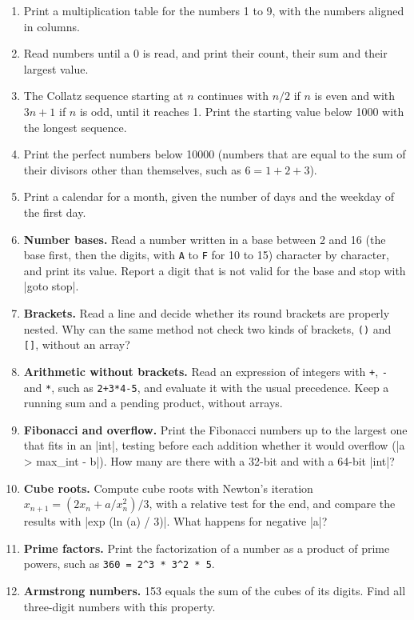 \begin{enumerate}
\item Print a multiplication table for the numbers 1 to 9, with the
  numbers aligned in columns.
\item Read numbers until a 0 is read, and print their count, their sum and
  their largest value.
\item The Collatz sequence starting at $n$ continues with $n/2$ if $n$ is
  even and with $3n+1$ if $n$ is odd, until it reaches 1. Print the
  starting value below 1000 with the longest sequence.
\item Print the perfect numbers below 10000 (numbers that are equal to
  the sum of their divisors other than themselves, such as
  $6 = 1 + 2 + 3$).
\item Print a calendar for a month, given the number of days and the
  weekday of the first day.
\item \textbf{Number bases.} Read a number written in a base between 2
  and 16 (the base first, then the digits, with \texttt{A} to
  \texttt{F} for 10 to 15) character by character, and print its value.
  Report a digit that is not valid for the base and stop with
  \code|goto stop|.
\item \textbf{Brackets.} Read a line and decide whether its round
  brackets are properly nested. Why can the same method not check two
  kinds of brackets, \texttt{()} and \texttt{[]}, without an array?
\item \textbf{Arithmetic without brackets.} Read an expression of
  integers with \texttt{+}, \texttt{-} and \texttt{*}, such as
  \texttt{2+3*4-5}, and evaluate it with the usual precedence. Keep a
  running sum and a pending product, without arrays.
\item \textbf{Fibonacci and overflow.} Print the Fibonacci numbers up
  to the largest one that fits in an \code|int|, testing before each
  addition whether it would overflow (\code|a > max_int - b|). How many
  are there with a 32-bit and with a 64-bit \code|int|?
\item \textbf{Cube roots.} Compute cube roots with Newton's iteration
  $x_{n+1} = (2 x_n + a / x_n^2) / 3$, with a relative test for the end,
  and compare the results with \code|exp (ln (a) / 3)|. What happens for
  negative \code|a|?
\item \textbf{Prime factors.} Print the factorization of a number as a
  product of prime powers, such as \texttt{360 = 2\^{}3 * 3\^{}2 * 5}.
\item \textbf{Armstrong numbers.} 153 equals the sum of the cubes of its
  digits. Find all three-digit numbers with this property.
\end{enumerate}
